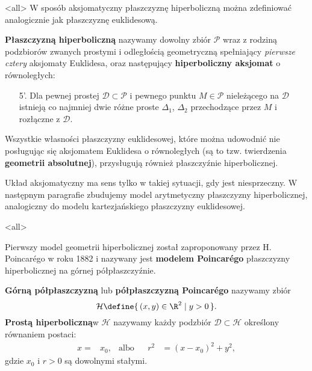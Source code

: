 \mode<all>{}
W sposób aksjomatyczny płaszczyznę hiperboliczną można zdefiniować analogicznie jak płaszczyznę euklidesową.
\begin{frame}
\begin{definicja}
\textbf{Płaszczyzną hiperboliczną} nazywamy dowolny zbiór $\mathcal{P}$ wraz z rodziną podzbiorów zwanych prostymi i odległością geometryczną spełniający \textit{pierwsze cztery} aksjomaty Euklidesa, oraz następujący \textbf{hiperboliczny aksjomat} o równoległych:
\begin{itemize}
\pause \item [5'.] Dla pewnej prostej $\mathcal{D}\subset \mathcal{P}$ i pewnego punktu $M\in \mathcal{P}$ nieleżącego na $\mathcal{D}$ istnieją co najmniej dwie różne proste $\Delta_1$, $\Delta_2$ przechodzące przez $M$ i rozłączne z $\mathcal{D}$.
\end{itemize}
\end{definicja}
\pause 
\begin{uwaga}
Wszystkie własności płaszczyzny euklidesowej, które można udowodnić nie posługując się aksjomatem Euklidesa o równoległych (są to tzw. twierdzenia \textbf{geometrii absolutnej}), przysługują również płaszczyźnie hiperbolicznej.
\end{uwaga}

\end{frame}

Układ aksjomatyczny ma sens tylko w takiej sytuacji, gdy jest niesprzeczny. 
W następnym paragrafie zbudujemy model arytmetyczny płaszczyzny hiperbolicznej, analogiczny do modelu
kartezjańskiego płaszczyzny euklidesowej. 

\mode<all>{}
\begin{frame}
Pierwszy model geometrii hiperbolicznej został zaproponowany przez H. Poincar\'{e}go w roku 1882 i nazywany jest 
\textbf{modelem Poincar\'{e}go} płaszczyzny hiperbolicznej na górnej półpłaszczyźnie.

\pause\begin{definicja} 
\textbf{Górną półpłaszczyzną} lub \textbf{półpłaszczyzną Poincar\'{e}go}
nazywamy zbiór \[\mathcal{H}\define\{\,(x,y)\in \R^2\mid y>0\,\}.\]
\pause \textbf{Prostą hiperboliczną}w $\mathcal{H}$ nazywamy każdy podzbiór $\mathcal{D}\subset \mathcal{H}$ określony równaniem postaci: 
\begin{align*}
x=&x_{0}, & \text{albo} & & r^2&=(x-x_{0})^{2}+y^{2},
\end{align*}gdzie $x_{0}$ i $r>0$ są dowolnymi stałymi.
\end{definicja}

\end{frame}

